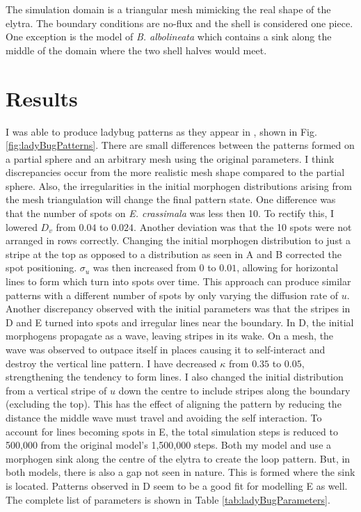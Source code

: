 The simulation domain is a triangular mesh mimicking the real shape of the elytra. The boundary conditions are no-flux and the shell is considered one piece. One exception is the model of  \textit{B. albolineata} which contains a sink along the middle of the domain where the two shell halves would meet. 

\section{Results}
I was able to produce ladybug patterns as they appear in \citep{liaw2001}, shown in Fig. \ref{fig:ladyBugPatterns}. There are small differences between the patterns formed on a partial sphere and an arbitrary mesh using the original parameters. I think discrepancies occur from the more realistic mesh shape compared to the partial sphere. Also, the irregularities in the initial morphogen distributions arising from the mesh triangulation will change the final pattern state. One difference was that the number of spots on \textit{E. crassimala} was less then 10. To rectify this, I lowered $D_v$ from $0.04$ to $0.024$. Another deviation was that the 10 spots were not arranged in rows correctly. Changing the initial morphogen distribution to just a stripe at the top as opposed to a distribution as seen in A and B corrected the spot positioning. $\sigma_u$ was then increased from $0$ to $0.01$, allowing for horizontal lines to form which turn into spots over time. This approach can produce similar patterns  with a different number of spots by only varying the diffusion rate of $u$. Another discrepancy observed with the initial parameters was that the stripes in D and E turned into spots and irregular lines near the boundary. In D, the initial morphogens propagate as a wave, leaving stripes in its wake. On a mesh, the wave was observed to outpace itself in places causing it to self-interact and destroy the vertical line pattern. I have decreased $\kappa$ from $0.35$ to $0.05$, strengthening the tendency to form lines. I also changed the initial distribution from a vertical stripe of $u$ down the centre to include stripes along the boundary (excluding the top). This has the effect of aligning the pattern by reducing the distance the middle wave must travel and avoiding the self interaction. To account for lines becoming spots in E, the total simulation steps is reduced to 500,000 from the original model's 1,500,000 steps. Both my model and \citep{liaw2001} use a morphogen sink along the centre of the elytra to create the loop pattern. But, in both models, there is also a gap not seen in nature. This is formed where the sink is located. Patterns observed in D seem to be a good fit for modelling E as well. The complete list of parameters is shown in Table \ref{tab:ladyBugParameters}.


